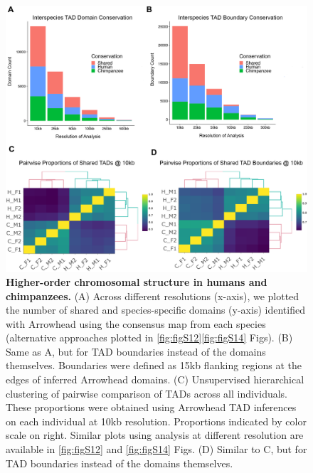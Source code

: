 \begin{figure}
\centering
\includegraphics[width=6in]{img/fig4.PNG}
\caption[Higher-order chromosomal structure in humans and chimpanzees.]{\textbf{Higher-order chromosomal structure in humans and chimpanzees.} (A) Across different resolutions (x-axis), we plotted the number of shared and species-specific domains (y-axis) identified with Arrowhead \cite{Durand.2016} using the consensus map from each species (alternative approaches plotted in \ref{fig:figS12}{\textendash}\ref{fig:figS14} Figs). (B) Same as A, but for TAD boundaries instead of the domains themselves. Boundaries were defined as 15kb flanking regions at the edges of inferred Arrowhead domains. (C) Unsupervised hierarchical clustering of pairwise comparison of TADs across all individuals. These proportions were obtained using Arrowhead TAD inferences on each individual at 10kb resolution. Proportions indicated by color scale on right. Similar plots using analysis at different resolution are available in \ref{fig:figS12} and \ref{fig:figS14} Figs. (D) Similar to C, but for TAD boundaries instead of the domains themselves.}
\label{fig:fig4}
\end{figure}

